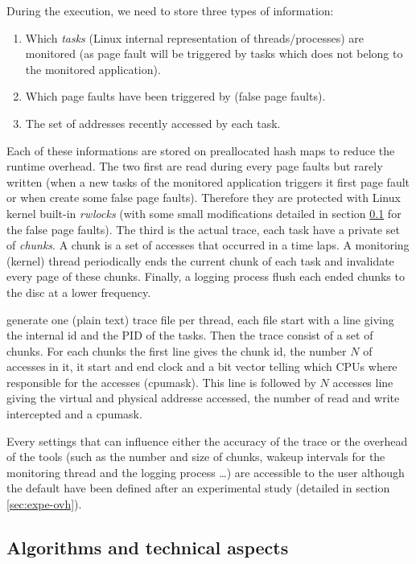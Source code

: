 During the execution, we need to store three types of information:
\begin{enumerate}
    \item Which \emph{tasks} (Linux internal representation of threads/processes) are
monitored (as page fault will be triggered by tasks which does not belong to
the monitored application).
    \item Which page faults have been triggered by \Moca (false page faults).
    \item The set of addresses recently accessed by each task.
\end{enumerate}
Each of these informations are stored on preallocated hash maps to reduce the
runtime overhead. The two first are read during every page faults but rarely
written (when a new tasks of the monitored application triggers it first page
fault or when \Moca create some false page faults). Therefore they are
protected with Linux kernel built-in \emph{rwlocks} (with some small
modifications detailed in section \ref{sec:design-tech} for the false page
faults). The third is the actual trace, each task have a private set of
\emph{chunks}. A chunk is a set of accesses that occurred in a time laps. A
monitoring (kernel) thread periodically ends the current chunk of each task
and invalidate every page of these chunks. Finally, a logging process flush
each ended chunks to the disc at a lower frequency.

\Moca generate one (plain text) trace file per thread, each file start with a
line giving the internal id and the PID of the tasks. Then the trace consist
of a set of chunks. For each chunks the first line gives the chunk id, the
number $N$ of accesses in it, it start and end clock and a bit vector telling
which CPUs where responsible for the accesses (cpumask). This line is followed
by $N$ accesses line giving the virtual and physical addresse accessed, the
number of read and write intercepted and a cpumask.

Every settings that can influence either the accuracy of the trace or the
overhead of the tools (such as the number and size of chunks, wakeup intervals
for the monitoring thread and the logging process \ldots) are accessible to the
user although the default have been defined after an experimental study
(detailed in section \ref{sec:expe-ovh}).

\subsection{Algorithms and technical aspects}
\label{sec:design-tech}

